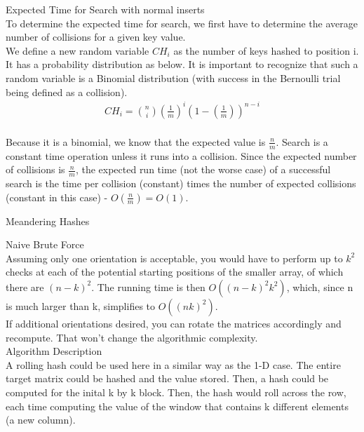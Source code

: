 \documentclass[12pt,twoside]{article}
\begin{document}
\begin{problems}
\begin{problemparts}
\problempart Expected Time for Search with normal inserts\\
To determine the expected time for search, we first have to determine the average number of collisions for a given key value.\\

We define a new random variable $CH_i$ as the number of keys hashed to position i.  It has a probability distribution as below.  It is important to recognize that such a random variable is a Binomial distribution (with success in the Bernoulli trial being defined as a collision).\\

\begin{align*}
CH_i = \binom{n}{i}\left(\frac{1}{m}\right)^i \left(1 - \left(\frac{1}{m}\right)\right)^{n-i}\\
\end{align*}

Because it is a binomial, we know that the expected value is $\frac{n}{m}$.  Search is a constant time operation unless it runs into a collision.  Since the expected number of collisions is $\frac{n}{m}$, the expected run time (not the worse case) of a successful search is the time per collision (constant) times the number of expected collisions (constant in this case) - $O( \frac{n}{m}) = O(1)$.\\
\end{problemparts}
\problem Meandering Hashes
\begin{problemparts}

\problempart Naive Brute Force\\
Assuming only one orientation is acceptable, you would have to perform up to $k^2$ checks at each of the potential starting positions of the smaller array, of which there are $(n-k)^2$.  The running time is then $O( (n-k)^2k^2)$, which, since n is much larger than k, simplifies to $O( (nk)^2)$.\\

If additional orientations desired, you can rotate the matrices accordingly and recompute. That won't change the algorithmic complexity.\\

\problempart Algorithm Description\\
A rolling hash could be used here in a similar way as the 1-D case. The entire target matrix could be hashed and the value stored.  Then, a hash could be computed for the inital k by k block.  Then, the hash would roll across the row, each time computing the value of the window that contains k different elements (a new column).\\


\end{problemparts}
\end{problems}
\end{document}
